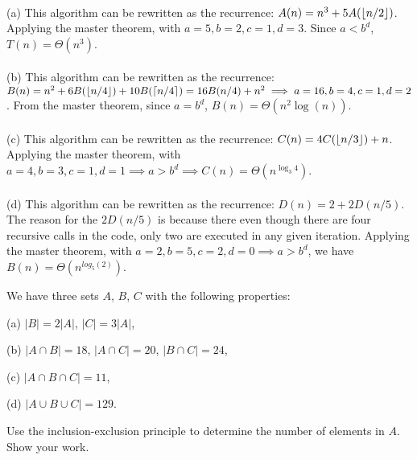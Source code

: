 \documentclass[11pt]{article}
\begin{document}
\begin{solution}
   \\
	(a) This algorithm can be rewritten as the recurrence: $A(n) = n^3 + 5A({\left\lfloor n/2\right\rfloor})$. Applying the master theorem, with $a = 5, b=2, c=1, d=3$. Since $a < b^d$, $T(n) = \Theta(n^3)$.
   \\\\
   (b) This algorithm can be rewritten as the recurrence: $B(n) = n^2 + 6B({\left\lfloor n/4\right\rfloor}) + 10B(\lceil{n/4}\rceil) = 16B(n/4) + n^2 \implies a=16, b=4, c=1, d=2$. From the master theorem, since $a=b^d$, $B(n) = \Theta(n^2\log(n))$.
   \\\\
   (c) This algorithm can be rewritten as the recurrence: $C(n) = 4C({\left\lfloor n/3\right\rfloor}) + n$. Applying the master theorem, with $a=4, b=3, c=1, d=1 \implies a > b^d \implies C(n) = \Theta(n^{\log_3{4}})$.
   \\\\
   (d) This algorithm can be rewritten as the recurrence: $D(n) = 2 + 2D(n/5)$. The reason for the $2D(n/5)$ is because there even though there are four recursive calls in the code, only two are executed in any given iteration. Applying the master theorem, with $a=2,b=5,c=2,d=0 \implies a > b^d$, we have $B(n) = \Theta(n^{log_5(2)})$.
\end{solution}


\newpage
\vspace{0.1in}
\begin{problem}
We have three sets $A$, $B$, $C$ with the following properties:

\begin{description}

\item{(a)}  $|B| = 2|A|$, $|C| = 3|A|$, 


\item{(b)} $|A\cap B| = 18$,
        $|A\cap C| = 20$,
        $|B\cap C| = 24$,

\item{(c)}
$|A\cap B\cap C| = 11$,

\item{(d)}
$|A\cup B\cup C| = 129$.

\end{description}

\noindent Use the inclusion-exclusion principle to determine the number of elements in $A$. 
Show your work.
\end{problem}
\end{document}
